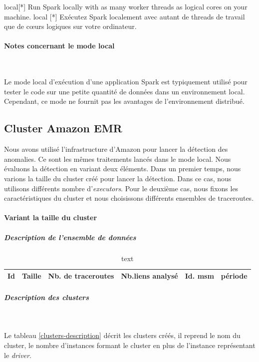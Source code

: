 local[*] Run Spark locally with as many worker threads as logical cores on your machine.
local [*] Exécutez Spark localement avec autant de threads de travail que de c\oe{}urs logiques sur votre ordinateur.

\paragraph{Notes concernant le mode local}~

Le mode local d'exécution d'une application Spark est typiquement utilisé pour tester le code sur une petite quantité de données dans un environnement local. Cependant, ce mode  ne fournit pas les avantages de l'environnement distribué. 

\subsection{Cluster Amazon EMR}

Nous avons utilisé l'infrastructure d'Amazon pour lancer la détection des anomalies. Ce sont les mêmes traitements lancés dans le mode local. Nous évaluons la détection en variant deux éléments. Dans un premier temps, nous varions la taille du cluster créé pour lancer la détection. Dans ce cas, nous utilisons différents nombre d'\textit{executors}. Pour le deuxième cas, nous fixons les caractéristiques du cluster et  nous choisissons différents ensembles de traceroutes. 
\paragraph{Variant la taille du cluster}


\subparagraph{Description de l'ensemble de données}

\begin{table}[H]
	\centering
	\begin{tabular}{|c|c|c|c|c|c|}
	\hline 
Id	& Taille  & Nb. de traceroutes & Nb.liens analysé & Id. msm& période \\ 
	\hline 
\end{tabular} 
\caption{text}
\label{key}
\end{table}



\subparagraph{Description des clusters}~

Le tableau \ref{clusters-description} décrit les clusters créés, il reprend le nom du cluster, le nombre d'instances formant le cluster en plus de l'instance représentant le \textit{driver}. 

